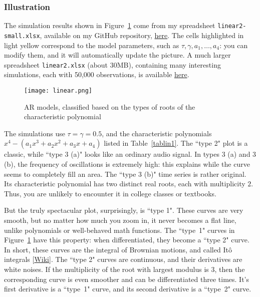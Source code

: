 \documentclass[oneside,10pt]{book}
\begin{document}
\subsubsection{Illustration}

The simulation results shown in Figure~\ref{fig:linearbv} come from my spreadsheet \texttt{linear2-small.xlsx}, available on my GitHub repository,
\href{https://github.com/VincentGranville/Machine-Learning/blob/main/Spreadsheets/README.md}{here}. The cells highlighted in light yellow
correspond to the model parameters, such as $\tau,\gamma, a_1,\dots,a_4$: you can modify them, and it will automatically update the picture.
A much larger spreadsheet \texttt{linear2.xlsx} (about 30MB), containing many interesting simulations, each with 50,000 observations,
 is available \href{https://ln5.sync.com/dl/4c157bf10/5be4uhcd-w6g99e8h-96ndb9t4-jshr672n}{here}.

\begin{figure}%
\centering
\texttt{[image: linear.png]}
\caption{AR models, classified based on the types of roots of the characteristic polynomial}
\label{fig:linearbv}
\end{figure}


The simulations use $\tau=\gamma=0.5$, and the characteristic polynomials $x^4-(a_1x^3+a_2 x^2 +a_3 x + a_4)$ listed
in Table~\ref{tablin1}. The ``type 2" plot is a classic, while ``type 3 (a)" looks like an ordinary audio signal.
In types 3 (a) and 3 (b), the frequency of oscillations is extremely high: this explains while the curve seems to completely fill an area.
The ``type 3 (b)" time series is rather original. Its characteristic polynomial has two distinct real roots, each with multiplicity $2$. Thus, you are
unlikely to encounter it in college classes or textbooks.

But the truly spectacular plot, surprisingly, is ``type 1". These curves are very smooth,
 but no matter how much you zoom in, it never becomes a flat line, unlike polynomials or well-behaved math functions. The ``type~1" curves  in
 Figure~\ref{fig:linearbv} have this property: when differentiated, they become a ``type 2" curve. In short,
these curves are the integral of Brownian motions, and called \textcolor{index}{Itô integrals} [\href{https://www.robots.ox.ac.uk/~lsgs/posts/2018-09-30-ito-strat.html}{Wiki}]. The ``type 2" curves  are continuous, and their derivatives are white noises.
If the multiplicity of the root with largest modulus is $3$, then the corresponding curve is even smoother and can be differentiated three times. It's first derivative is a ``type~1" curve, and its second derivative is a ``type~2" curve.
\end{document}
